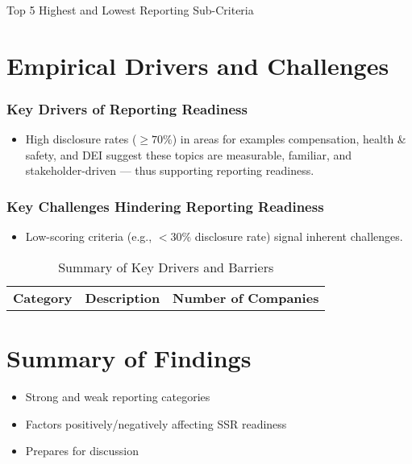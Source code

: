 \begin{table}[H]
    \centering
    \caption{Top 5 Highest and Lowest Reporting Sub-Criteria}
\end{table}

\section{Empirical Drivers and Challenges}

\subsubsection{Key Drivers of Reporting Readiness}
\begin{itemize}
    \item High disclosure rates ($\geq 70\%$) in areas for examples compensation, health \& safety, and DEI 
    suggest these topics are measurable, familiar, and stakeholder-driven — thus supporting reporting readiness.
\end{itemize}

\subsubsection{Key Challenges Hindering Reporting Readiness}
\begin{itemize}
    \item Low-scoring criteria (e.g., $<30\%$ disclosure rate) signal inherent challenges.       
\end{itemize}


\begin{table}[H]
    \centering
    \caption{Summary of Key Drivers and Barriers}
    \begin{tabular}{l l l}
        \textbf{Category} & \textbf{Description} & \textbf{Number of Companies} \\
    \end{tabular}
\end{table}

\section{Summary of Findings}
\begin{itemize}
    \item Strong and weak reporting categories
    \item Factors positively/negatively affecting SSR readiness
    \item Prepares for discussion
\end{itemize}